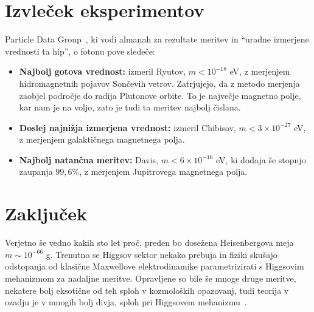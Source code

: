 \documentclass[a4paper, twocolumn, titlepage]{article}
\begin{document}
\section{Izvleček eksperimentov}

Particle Data Group~\cite{pdg}, ki vodi almanah za rezultate meritev in "`uradne izmerjene vrednosti ta hip"', o fotonu pove
sledeče:

\begin{itemize}
	\item{{\bf Najbolj gotova vrednost:} izmeril Ryutov, $m < 10^{-18}$ eV, z merjenjem hidromagnetnih pojavov Sončevih
		vetrov. Zatrjujejo, da z metodo merjenja zaobjel področje do radija Plutonove orbite. To je največje
		magnetno polje, kar nam je na voljo, zato je tudi ta meritev najbolj čislana.}
	\item{{\bf Doslej najnižja izmerjena vrednost:} izmeril Chibisov, $m < 3\times10^{-27}$ eV, z merjenjem galaktičnega
		magnetnega polja.}
	\item{{\bf Najbolj natančna meritev:} Davis, $m < 6\times10^{-16}$ eV, ki dodaja še stopnjo zaupanja $99,6\%$, z
		merjenjem Jupitrovega magnetnega polja.}
\end{itemize}

\section{Zaključek}

Verjetno še vedno kakih sto let proč, preden bo dosežena
Heisenbergova meja $m \sim 10^{-66}$ g. Trenutno se Higgsov sektor nekako prebuja in fiziki skušajo odstopanja od klasične
Maxwellove elektrodinamike parametrizirati s Higgsovim mehanizmom za nadaljne meritve. Opravljene so bile še mnoge druge
meritve, nekatere bolj eksotične od teh sploh v kozmoloških opazovanj, tudi teorija v ozadju je v mnogih bolj divja, sploh
pri Higgsovem mehanizmu~\cite{higgs}. 

%
\end{document}
